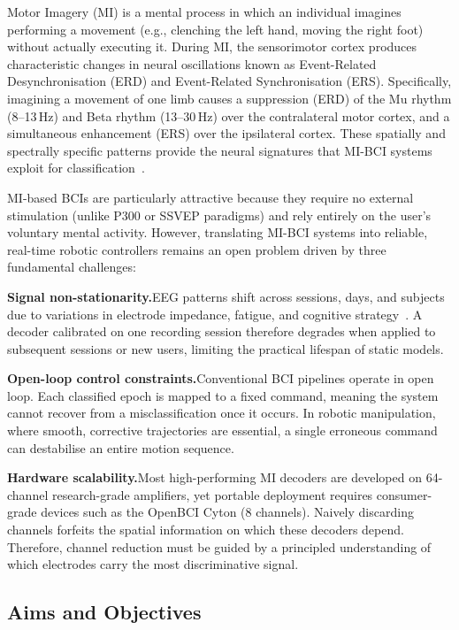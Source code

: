 \documentclass[12pt, a4paper]{article}
\begin{document}
Motor Imagery (MI) is a mental process in which an individual imagines performing a movement (e.g., clenching the left hand, moving the right foot) without actually executing it. During MI, the sensorimotor cortex produces characteristic changes in neural oscillations known as Event-Related Desynchronisation (ERD) and Event-Related Synchronisation (ERS). Specifically, imagining a movement of one limb causes a suppression (ERD) of the Mu rhythm (8--13\,Hz) and Beta rhythm (13--30\,Hz) over the contralateral motor cortex, and a simultaneous enhancement (ERS) over the ipsilateral cortex. These spatially and spectrally specific patterns provide the neural signatures that MI-BCI systems exploit for classification~\cite{hameed2025enhancing}.

MI-based BCIs are particularly attractive because they require no external stimulation (unlike P300 or SSVEP paradigms) and rely entirely on the user's voluntary mental activity. However, translating MI-BCI systems into reliable, real-time robotic controllers remains an open problem driven by three fundamental challenges:

\textbf{Signal non-stationarity.}\quad EEG patterns shift across sessions, days, and subjects due to variations in electrode impedance, fatigue, and cognitive strategy~\cite{hameed2025enhancing}. A decoder calibrated on one recording session therefore degrades when applied to subsequent sessions or new users, limiting the practical lifespan of static models.

\textbf{Open-loop control constraints.}\quad Conventional BCI pipelines operate in open loop. Each classified epoch is mapped to a fixed command, meaning the system cannot recover from a misclassification once it occurs. In robotic manipulation, where smooth, corrective trajectories are essential, a single erroneous command can destabilise an entire motion sequence.

\textbf{Hardware scalability.}\quad Most high-performing MI decoders are developed on 64-channel research-grade amplifiers, yet portable deployment requires consumer-grade devices such as the OpenBCI Cyton (8 channels). Naively discarding channels forfeits the spatial information on which these decoders depend. Therefore, channel reduction must be guided by a principled understanding of which electrodes carry the most discriminative signal.

\subsection{Aims and Objectives}
\end{document}
